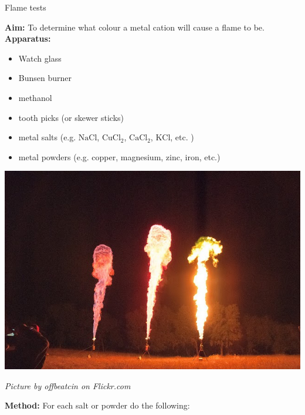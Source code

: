 \begin{i_experiment}{Flame tests}{
            \nopagebreak
            \label{m38741*eip-699}\noindent{}\textbf{Aim: } To determine what colour a metal cation will cause a flame to be. \\
\label{m38741*eip-6991}\noindent{}\textbf{Apparatus:}\newline
\begin{minipage}{.5\textwidth}
\begin{itemize}[noitemsep]
\item Watch glass
\item Bunsen burner
\item methanol
\item tooth picks (or skewer sticks)
\item metal salts (e.g.\@{} $\text{NaCl}$, ${\text{CuCl}}_{2}$, ${\text{CaCl}}_{2}$, $\text{KCl}$, etc. )
\item metal powders (e.g.\@{} copper, magnesium, zinc, iron, etc.)
\end{itemize}
\end{minipage}
\begin{minipage}{.5\textwidth}
\begin{center}
 \includegraphics[width=.8\textwidth]{photos/offbeatcin.jpg}\par
\textit{Picture by offbeatcin on Flickr.com}
\end{center}
\end{minipage}
\label{m38741*eip-6992}\noindent{}\textbf{Method: } For each salt or powder do the following:
\begin{enumerate}[noitemsep, label=\textbf{\arabic*}. ] 

\end{enumerate}}
\end{i_experiment}
